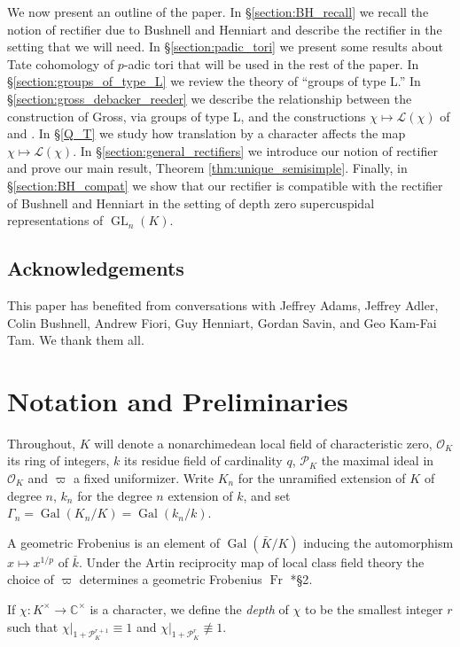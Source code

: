 \documentclass{compositio}
\theoremstyle{plain}
\theoremstyle{definition}
\numberwithin{equation}{section}
\DeclareMathOperator{\Gal}{Gal}
\DeclareMathOperator{\Fr}{Fr}
\DeclareMathOperator{\GL}{GL}
\newcommand{\OK}{\mathcal{O}_K}
\newcommand{\PK}{\mathcal{P}_K}
\newcommand{\Lpack}{\mathcal{L}}
\begin{document}
We now present an outline of the paper.  In \S\ref{section:BH_recall} we recall
the notion of rectifier due to Bushnell and Henniart and describe
the rectifier in the setting that we will need.  In \S\ref{section:padic_tori}
we present some results about Tate cohomology of $p$-adic tori that will be used
in the rest of the paper.  In \S\ref{section:groups_of_type_L} we review
the theory of ``groups of type L.''  In
\S\ref{section:gross_debacker_reeder} we describe the relationship between the
construction of Gross, via groups of type L, and the constructions $\chi \mapsto \Lpack(\chi)$ of
\cite{reeder-debacker:09a} and \cite{reeder:08a}.  In \S\ref{Q_T} we study how translation by a character affects
the map $\chi \mapsto \Lpack(\chi)$.
In \S\ref{section:general_rectifiers} we
introduce our notion of rectifier and prove our main result, Theorem \ref{thm:unique_semisimple}.
Finally, in \S\ref{section:BH_compat} we show that our rectifier is compatible with
the rectifier of Bushnell and Henniart in the setting of depth zero
supercuspidal representations of $\GL_n(K)$.

\subsection*{Acknowledgements}

This paper has benefited from conversations with Jeffrey Adams, Jeffrey Adler, Colin Bushnell,
Andrew Fiori, Guy Henniart, Gordan Savin, and Geo Kam-Fai Tam.  We thank them all.

\section{Notation and Preliminaries} \label{section:notation}

Throughout, $K$ will denote a nonarchimedean local field of
characteristic zero, $\OK$ its ring of integers, $k$ its residue field of cardinality $q$,
$\PK$ the maximal ideal in $\OK$ and $\varpi$ a fixed uniformizer.
Write $K_n$ for the unramified extension of $K$ of degree $n$, $k_n$ for
the degree $n$ extension of $k$,
and set $\Gamma_n = \Gal(K_n/K) = \Gal(k_n/k)$.

A geometric Frobenius is an element of $\Gal(\bar{K}/K)$
inducing the automorphism $x \mapsto x^{1/p}$ of $\bar{k}$.  Under the
Artin reciprocity map of local class field theory the choice of $\varpi$
determines a geometric Frobenius $\Fr$ \cite{serre:LocalClassFieldThy}*{\S 2}.

If $\chi : K^{\times} \rightarrow \mathbb{C}^{\times}$ is a character, we define
the \emph{depth} of $\chi$ to be the smallest integer $r$ such that
$\chi|_{1 + \PK^{r+1}} \equiv 1$ and
$\chi|_{1 + \PK^{r}} \not\equiv 1$.
\end{document}
